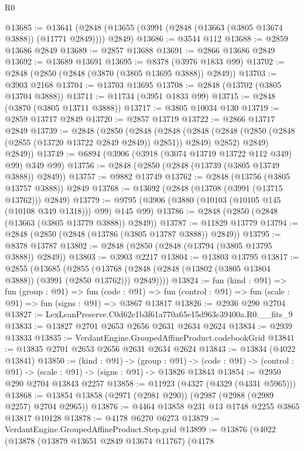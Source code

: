 \begin{lexlean}{R0}
\begin{coremodule}
@13685 := @13641 (@2848 (@13655 (@3991 (@2848 (@13663 (@3805 @13674 @3888)) (@11771 @2849)))) @2849)
@13686 := @3544 @112
@13688 := @2859 @13686 @2849
@13689 := @2857 @13688
@13691 := @2866 @13686 @2849
@13692 := @13689 @13691
@13695 := @8378 (@3976 @1833 @99)
@13702 := @2848 (@2850 (@2848 (@3870 (@3805 @13695 @3888)) @2849))
@13703 := @3903 @2168
@13704 := @13703 @13695
@13708 := @2848 (@13702 (@3805 @13704 @3888))
@13711 := @11734 (@3951 @1833 @99)
@13715 := @2848 (@3870 (@3805 @13711 @3888))
@13717 := @3805 @10034 @130
@13719 := @2859 @13717 @2849
@13720 := @2857 @13719
@13722 := @2866 @13717 @2849
@13739 := @2848
    (@2850
      (@2848
        (@2848
          (@2848 (@2848 (@2850 (@2848 (@2855 (@13720 @13722 @2849 @2849)) @2851)) @2849) @2852)
          @2849)
        @2849))
@13749 := @6894 (@3906 (@3918 (@3074 @13719 @13722 @112 @349) @99) @349 @99)
@13756 := @2848 (@2850 (@2848 (@13739 (@3805 @13749 @3888)) @2849))
@13757 := @9882 @13749
@13762 := @2848 (@13756 (@3805 @13757 @3888)) @2849
@13768 := @13692 (@2848 (@13708 (@3991 (@13715 @13762))) @2849)
@13779 := @9795 (@3906 (@3880 (@10103 (@10105 @145 (@10108 @349 @1318))) @99) @145 @99)
@13786 := @2848 (@2850 (@2848 (@13663 (@3805 @13779 @3888)) @2849))
@13787 := @11829 @13779
@13794 := @2848 (@2850 (@2848 (@13786 (@3805 @13787 @3888)) @2849))
@13795 := @8378 @13787
@13802 := @2848 (@2850 (@2848 (@13794 (@3805 @13795 @3888)) @2849))
@13803 := @3903 @2217
@13804 := @13803 @13795
@13817 := @2855
    (@13685
      (@2855 (@13768 (@2848 (@2848 (@13802 (@3805 @13804 @3888)) (@3991 (@2850 @13762))) @2849))))
@13824 := fun (kind : @91) =>
  fun (group : @91) =>
  fun (code : @91) => fun (control : @91) => fun (scale : @91) => fun (signs : @91) => @3867 @13817
@13826 := @2936 @290 @2704
@13827 := LexLeanPreserve.C0d62e1b3f61a770a65e15d963c39400a.R0.__fits_9
@13833 := @13827 @2701 @2653 @2656 @2631 @2634 @2624
@13834 := @2939 @13833
@13835 := VerdantEngine.GroupedAffineProduct.codebookGrid
@13841 := @13835 @2701 @2653 @2656 @2631 @2634 @2624
@13843 := @13834 (@4022 @13841)
@13850 := (kind : @91) ->
  (group : @91) ->
  (code : @91) -> (control : @91) -> (scale : @91) -> (signs : @91) -> @13826 @13843
@13854 := @2950 @290 @2704 @13843 @2257
@13858 := @11923 (@4327 (@4329 (@4331 @5965)))
@13868 := @13854 @13858 (@2971 (@2981 @290)) (@2987 (@2988 (@2989 @2257) @2704 @2965))
@13876 := @4464 @13858 @231 @13 @1748 @2255 @3865 @13817 @10128
@13878 := @4178 @6270 @6273
@13879 := VerdantEngine.GroupedAffineProduct.Step.grid
@13899 := @13876
    (@4022
      (@13878
        (@13879 @13651 @2849 @13674 @11767)
        (@4178

\end{coremodule}
\end{lexlean}
